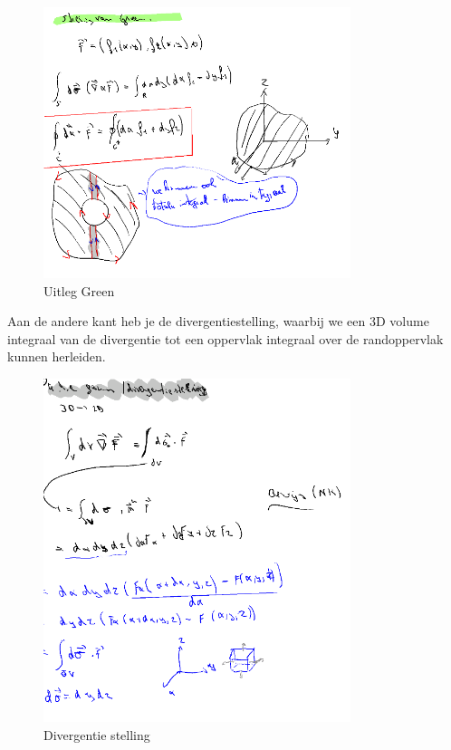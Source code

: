 \documentclass[a4paper]{article}
\begin{document}
\begin{figure}[H]
	\centering
	\includegraphics[width=0.8\textwidth]{assets/uitleg_green.png}
	\caption{Uitleg Green}
	\label{fig:uitleg_green}
\end{figure}


Aan de andere kant heb je de divergentiestelling, waarbij we een 3D volume integraal van de divergentie tot een oppervlak integraal over de randoppervlak kunnen herleiden.

\begin{figure}[H]
	\centering
	\includegraphics[width=0.8\textwidth]{assets/divergentie_stelling.png}
	\caption{Divergentie stelling}
	\label{fig:divergentie_stelling}
\end{figure}
\end{document}
